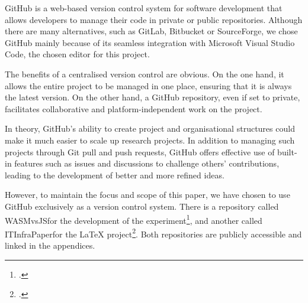 GitHub is a web-based version control system for software development that allows developers to manage their code in private or public repositories. Although there are many alternatives, such as GitLab, Bitbucket or SourceForge, we chose GitHub mainly because of its seamless integration with Microsoft Visual Studio Code, the chosen editor for this project.

The benefits of a centralised version control are obvious. On the one hand, it allows the entire project to be managed in one place, ensuring that it is always the latest version. On the other hand, a GitHub repository, even if set to private, facilitates collaborative and platform-independent work on the project.

In theory, GitHub's ability to create project and organisational structures could make it much easier to scale up research projects. In addition to managing such projects through Git pull and push requests, GitHub offers effective use of built-in features such as issues and discussions to challenge others' contributions, leading to the development of better and more refined ideas.

However, to maintain the focus and scope of this paper, we have chosen to use GitHub exclusively as a version control system. There is a repository called \dq WASMvsJS\dq  for the development of the experiment\footcite{fuchs_github_nodate}, and another called \dq ITInfraPaper\dq  for the \LaTeX{} project\footcite{ruber_github_nodate}. Both repositories are publicly accessible and linked in the appendices.